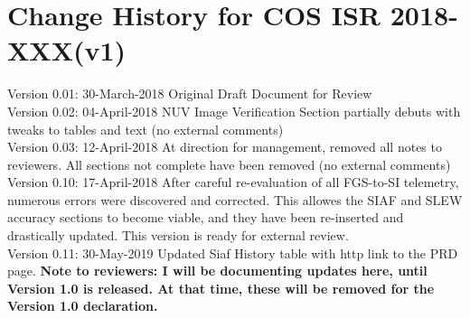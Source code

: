 \documentclass{stsci_report}
\newcommand{\thisISR}{COS ISR 2018-XXX(v1)}
\begin{document}
\section{Change History for \thisISR}\label{sec:History}
Version 0.01: 30-March-2018 Original Draft Document for Review \\
Version 0.02: 04-April-2018 NUV Image Verification Section partially debuts with tweaks to tables and text (no external comments) \\
Version 0.03: 12-April-2018 At direction for management, removed all notes to reviewers. All sections not complete have been removed (no external comments)\\
Version 0.10: 17-April-2018 After careful re-evaluation of all FGS-to-SI telemetry, numerous errors were discovered and corrected. This allowes the SIAF and SLEW accuracy sections to become viable, and they have been re-inserted and drastically updated. This version is ready for external review.\\
Version 0.11: 30-May-2019 Updated Siaf History table with http link to the PRD page.
{\bf Note to reviewers: I will be documenting updates here, until Version 1.0 is released. At that time, these will be removed for the Version 1.0 declaration.}
\clearpage
\end{document}
